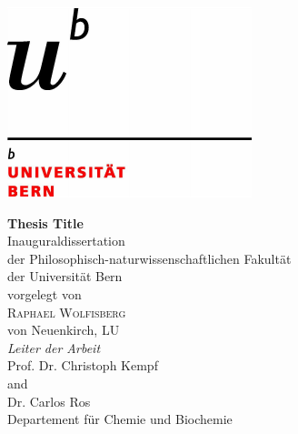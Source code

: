 \documentclass[11pt, numbers=noenddot, titlepage, a4paper, twoside, onecolumn, DIV=calc]{scrbook} %
\begin{document}



\frontmatter %

\setlength{\footskip}{35mm}





\begin{titlepage}
\begin{flushright}
\includegraphics[scale=0.8, trim= 1mm 1mm 5mm 20mm]{logo} \\[2.9 cm]
\end{flushright}
\begin{center}
{\Huge \bfseries Thesis Title} \\[2 cm]
{\Large Inauguraldissertation \\
der Philosophisch-naturwissenschaftlichen Fakultät \\
der Universität Bern \\[2.2 cm]
{\large vorgelegt von}\\[0.3 cm]
{\LARGE \textsc{Raphael Wolfisberg}} \\[0.3 cm] 
{\large von Neuenkirch, LU} \\ [1.2 cm]
{\Large \emph{Leiter der Arbeit}\\ [0.3 cm]
{\textsc Prof. Dr. Christoph Kempf} \\
and \\
{\textsc Dr. Carlos Ros} \\ [0.9 cm]
Departement für Chemie und Biochemie}}
\end{center}
\end{titlepage}
\end{document}
